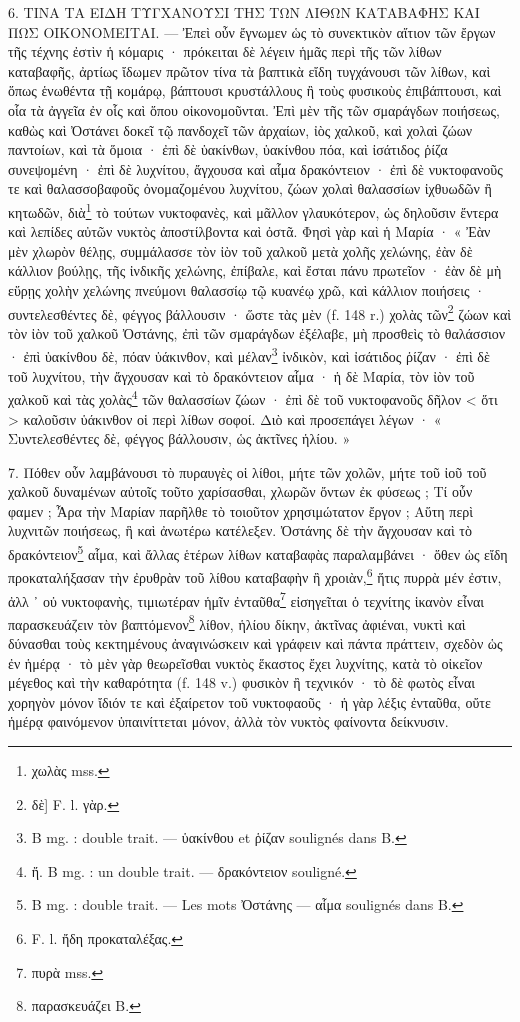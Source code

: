 \documentclass[a4paper, 11pt, oneside, polutonikogreek, french]{article}
\begin{document}
6. ΤΙΝΑ ΤΑ ΕΙΔΗ ΤΥΓΧΑΝΟΥΣΙ ΤΗΣ ΤΩΝ ΛΙΘΩΝ ΚΑΤΑΒΑΦΗΣ ΚΑΙ ΠΩΣ ΟΙΚΟΝΟΜΕΙΤΑΙ. --- Ἐπεὶ οὖν ἔγνωμεν ὡς τὸ συνεκτικὸν αἴτιον τῶν ἔργων τῆς τέχνης ἐστὶν ἡ κόμαρις · πρόκειται δὲ λέγειν ἡμᾶς περὶ τῆς τῶν λίθων καταβαφῆς, ἀρτίως ἴδωμεν πρῶτον τίνα τὰ βαπτικὰ εἴδη τυγχάνουσι τῶν λίθων, καὶ ὅπως ἑνωθέντα τῇ κομάρῳ, βάπτουσι κρυστάλλους ἢ τοὺς φυσικοὺς ἐπιβάπτουσι, καὶ οἷα τὰ ἀγγεῖα ἐν οἷς καὶ ὅπου οἰκονομοῦνται. Ἐπὶ μὲν τῆς τῶν σμαράγδων ποιήσεως, καθὼς καὶ Ὀστάνει δοκεῖ τῷ πανδοχεῖ τῶν ἀρχαίων, ἰὸς χαλκοῦ, καὶ χολαὶ ζώων παντοίων, καὶ τὰ ὅμοια · ἐπὶ δὲ ὑακίνθων, ὑακίνθου πόα, καὶ ἰσάτιδος ῥίζα συνεψομένη · ἐπὶ δὲ λυχνίτου, ἄγχουσα καὶ αἷμα δρακόντειον · ἐπὶ δὲ νυκτοφανοῦς τε καὶ θαλασσοβαφοῦς ὀνομαζομένου λυχνίτου, ζώων χολαὶ θαλασσίων ἰχθυωδῶν ἢ κητωδῶν, διὰ\footnote{χωλὰς mss.} τὸ τούτων νυκτοφανὲς, καὶ μᾶλλον γλαυκότερον, ὡς δηλοῦσιν ἔντερα καὶ λεπίδες αὐτῶν νυκτὸς ἀποστίλβοντα καὶ ὀστᾶ. Φησὶ γὰρ καὶ ἡ Μαρία · « Ἐὰν μὲν χλωρὸν θέλῃς, συμμάλασσε τὸν ἰὸν τοῦ χαλκοῦ μετὰ χολῆς χελώνης, ἐὰν δὲ κάλλιον βούλῃς, τῆς ἰνδικῆς χελώνης, ἐπίβαλε, καὶ ἔσται πάνυ πρωτεῖον · ἐὰν δὲ μὴ εὕρῃς χολὴν χελώνης πνεύμονι θαλασσίῳ τῷ κυανέῳ χρῶ, καὶ κάλλιον ποιήσεις · συντελεσθέντες δὲ, φέγγος βάλλουσιν · ὥστε τὰς μὲν (f. 148 r.) χολὰς τῶν\footnote{δὲ] F. l. γὰρ.} ζώων καὶ τὸν ἰὸν τοῦ χαλκοῦ Ὀστάνης, ἐπὶ τῶν σμαράγδων ἐξέλαβε, μὴ προσθεὶς τὸ θαλάσσιον · ἐπὶ ὑακίνθου δὲ, πόαν ὑάκινθον, καὶ μέλαν\footnote{B mg. : double trait. --- ὑακίνθου et ῥίζαν soulignés dans B.} ἰνδικὸν, καὶ ἰσάτιδος ῥίζαν · ἐπὶ δὲ τοῦ λυχνίτου, τὴν ἄγχουσαν καὶ τὸ δρακόντειον αἷμα · ἡ δὲ Μαρία, τὸν ἰὸν τοῦ χαλκοῦ καὶ τὰς χολὰς\footnote{ἤ. B mg. : un double trait. --- δρακόντειον souligné.} τῶν θαλασσίων ζώων · ἐπὶ δὲ τοῦ νυκτοφανοῦς δῆλον < ὅτι > καλοῦσιν ὑάκινθον οἱ περὶ λίθων σοφοί. Διὸ καὶ προσεπάγει λέγων · « Συντελεσθέντες δὲ, φέγγος βάλλουσιν, ὡς ἀκτῖνες ἡλίου. »

7. Πόθεν οὖν λαμβάνουσι τὸ πυραυγὲς οἱ λίθοι, μήτε τῶν χολῶν, μήτε τοῦ ἰοῦ τοῦ χαλκοῦ δυναμένων αὐτοῖς τοῦτο χαρίσασθαι, χλωρῶν ὄντων ἐκ φύσεως ; Τί οὖν φαμεν ; Ἆρα τὴν Μαρίαν παρῆλθε τὸ τοιοῦτον χρησιμώτατον ἔργον ; Αὕτη περὶ λυχνιτῶν ποιήσεως, ἣ καὶ ἀνωτέρω κατέλεξεν. Ὀστάνης δὲ τὴν ἄγχουσαν καὶ τὸ δρακόντειον\footnote{B mg. : double trait. --- Les mots Ὀστάνης --- αἷμα soulignés dans B.} αἷμα, καὶ ἄλλας ἑτέρων λίθων καταβαφὰς παραλαμβάνει · ὅθεν ὡς εἴδη προκαταλήξασαν τὴν ἐρυθρὰν τοῦ λίθου καταβαφὴν ἢ χροιὰν,\footnote{F. l. ἤδη προκαταλέξας.} ἥτις πυρρὰ μέν ἐστιν, ἀλλ ᾽ οὐ νυκτοφανὴς, τιμιωτέραν ἡμῖν ἐνταῦθα\footnote{πυρὰ mss.} εἰσηγεῖται ὁ τεχνίτης ἱκανὸν εἶναι παρασκευάζειν τὸν βαπτόμενον\footnote{παρασκευάζει B.} λίθον, ἡλίου δίκην, ἀκτῖνας ἀφιέναι, νυκτὶ καὶ δύνασθαι τοὺς κεκτημένους ἀναγινώσκειν καὶ γράφειν καὶ πάντα πράττειν, σχεδὸν ὡς ἐν ἡμέρᾳ · τὸ μὲν γὰρ θεωρεῖσθαι νυκτὸς ἕκαστος ἔχει λυχνίτης, κατὰ τὸ οἰκεῖον μέγεθος καὶ τὴν καθαρότητα (f. 148 v.) φυσικὸν ἢ τεχνικόν · τὸ δὲ φωτὸς εἶναι χορηγὸν μόνον ἴδιόν τε καὶ ἐξαίρετον τοῦ νυκτοφαοῦς · ἡ γὰρ λέξις ἐνταῦθα, οὔτε ἡμέρᾳ φαινόμενον ὑπαινίττεται μόνον, ἀλλὰ τὸν νυκτὸς φαίνοντα δείκνυσιν.
\end{document}
